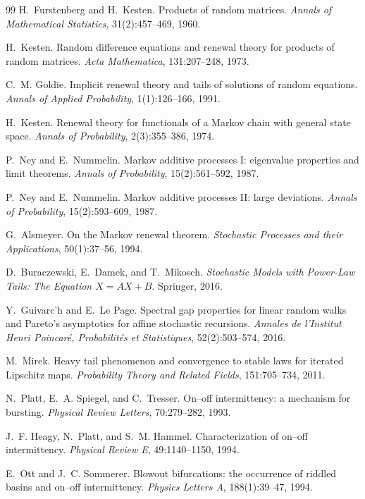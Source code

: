 \documentclass[10pt]{article}
\theoremstyle{definition}
\theoremstyle{remark}
\begin{document}
\begin{thebibliography}{99}
H.~Furstenberg and H.~Kesten. Products of random matrices.
\emph{Annals of Mathematical Statistics}, 31(2):457--469, 1960.

H.~Kesten. Random difference equations and renewal theory for products of
random matrices. \emph{Acta Mathematica}, 131:207--248, 1973.

C.~M. Goldie. Implicit renewal theory and tails of solutions of random
equations. \emph{Annals of Applied Probability}, 1(1):126--166, 1991.

H.~Kesten. Renewal theory for functionals of a Markov chain with general
state space. \emph{Annals of Probability}, 2(3):355--386, 1974.

P.~Ney and E.~Nummelin. Markov additive processes I: eigenvalue properties
and limit theorems. \emph{Annals of Probability}, 15(2):561--592, 1987.

P.~Ney and E.~Nummelin. Markov additive processes II: large deviations.
\emph{Annals of Probability}, 15(2):593--609, 1987.

G.~Alsmeyer. On the Markov renewal theorem.
\emph{Stochastic Processes and their Applications}, 50(1):37--56, 1994.

D.~Buraczewski, E.~Damek, and T.~Mikosch. \emph{Stochastic Models with
Power-Law Tails: The Equation $X=AX+B$}. Springer, 2016.

Y.~Guivarc'h and E.~Le Page. Spectral gap properties for linear random walks
and Pareto's asymptotics for affine stochastic recursions.
\emph{Annales de l'Institut Henri Poincar\'e, Probabilit\'es et Statistiques},
52(2):503--574, 2016.

M.~Mirek. Heavy tail phenomenon and convergence to stable laws for iterated
Lipschitz maps. \emph{Probability Theory and Related Fields},
151:705--734, 2011.

N.~Platt, E.~A. Spiegel, and C.~Tresser. On--off intermittency: a mechanism
for bursting. \emph{Physical Review Letters}, 70:279--282, 1993.

J.~F. Heagy, N.~Platt, and S.~M. Hammel. Characterization of on--off
intermittency. \emph{Physical Review E}, 49:1140--1150, 1994.

E.~Ott and J.~C. Sommerer. Blowout bifurcations: the occurrence of riddled
basins and on--off intermittency. \emph{Physics Letters A}, 188(1):39--47,
1994.


\end{thebibliography}
\end{document}
